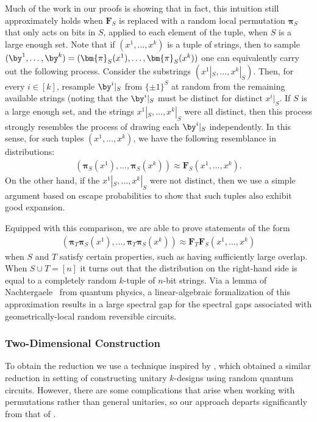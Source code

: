 Much of the work in our proofs is showing that in fact, this intuition still approximately holds when $\bm{F}_S$ is replaced with a random local permutation $\bm{\pi}_S$ that only acts on bits in $S$, applied to each element of the tuple, when $S$ is a large enough set. Note that if $(x^1,\dots,x^k)$ is a tuple of strings, then to sample $(\by^1,\dots,\by^k)=(\bm{\pi}_S(x^1),\dots,\bm{\pi}_S(x^k))$ one can equivalently carry out the following process. Consider the substrings $(x^1|_S,\dots,x^k|_S)$. Then, for every $i\in[k]$, resample $\by^i|_S$ from $\{\pm1\}^S$ at random from the remaining available strings (noting that the $\by^i|_S$ must be distinct for distinct $x^i|_S$. If $S$ is a large enough set, and the strings $x^1|_S,\dots,x^k|_S$ were all distinct, then this process strongly resembles the process of drawing each $\by^i|_S$ independently. In this sense, for such tuples $(x^1,\dots,x^k)$, we have the following resemblance in distributions:
\begin{align}\label{eq:approximation of permutations}
    (\bm{\pi}_S(x^1),\dots,\bm{\pi}_S(x^k)) \approx \bm{F}_S(x^1,\dots,x^k).
\end{align}
On the other hand, if the $x^1|_S,\dots,x^k|_S$ were not distinct, then we use a simple argument based on escape probabilities to show that such tuples also exhibit good expansion.

Equipped with this comparison, we are able to prove statements of the form 
\begin{align*}
    (\bm{\pi}_T\bm{\pi}_S(x^1),\dots,\bm{\pi}_T\bm{\pi}_S(x^k)) \approx \bm{F}_T\bm{F}_S(x^1,\dots,x^k)
\end{align*}
when $S$ and $T$ satisfy certain properties, such as having sufficiently large overlap. When $S\cup T=[n]$ it turns out that the distribution on the right-hand side is equal to a completely random $k$-tuple of $n$-bit strings. Via a lemma of Nachtergaele~\cite{nachtergaele1996spectral} from quantum physics, a linear-algebraic formalization of this approximation results in a large spectral gap for the spectral gaps associated with geometrically-local random reversible circuits.




\subsubsection{Two-Dimensional Construction}
To obtain the reduction  we use a technique inspired by \cite{harrow2023approximate}, which obtained a similar reduction in setting of constructing unitary $k$-designs using random quantum circuits. However, there are some complications that arise when working with permutations rather than general unitaries, so our approach departs significantly from that of \cite{harrow2023approximate}.

